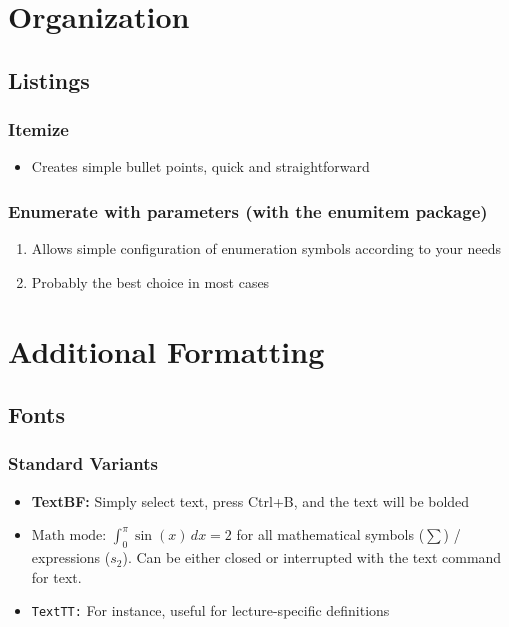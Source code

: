 \documentclass{scrartcl}
\author{\myauthor}
\title{\mytitle}
\subtitle{\mysubtitle}
\begin{document}

\maketitle
\thispagestyle{empty} %
\tableofcontents  %
\thispagestyle{empty} %
\newpage
\setcounter{page}{1}

\section{Organization}
\subsection{Listings}
\subsubsection{Itemize}
\begin{itemize}
    \item Creates simple bullet points, quick and straightforward
\end{itemize}
\subsubsection{Enumerate with parameters (with the enumitem package)}
\begin{enumerate}[label=\alph*)]
    \item Allows simple configuration of enumeration symbols according to your needs
    \item Probably the best choice in most cases
\end{enumerate}

\section{Additional Formatting}
\subsection{Fonts}
\subsubsection{Standard Variants}
\begin{itemize}
    \item \textbf{TextBF:} Simply select text, press Ctrl+B, and the text will be bolded
    \item $\text{Math mode: } \int_{0}^{\pi} \sin(x) \, dx = 2$ for all mathematical symbols ($\sum$) / expressions ($s_2$). Can be either closed or interrupted with the text command for text.
    \item \texttt{TextTT:} For instance, useful for lecture-specific definitions
\end{itemize}
\end{document}

